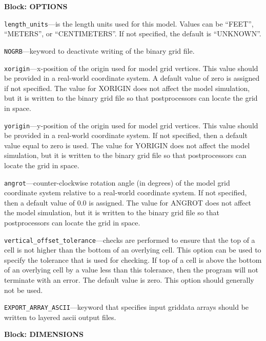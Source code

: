 
\item \textbf{Block: OPTIONS}

\begin{description}
\item \texttt{length\_units}---is the length units used for this model.  Values can be ``FEET'', ``METERS'', or ``CENTIMETERS''.  If not specified, the default is ``UNKNOWN''.

\item \texttt{NOGRB}---keyword to deactivate writing of the binary grid file.

\item \texttt{xorigin}---x-position of the origin used for model grid vertices.  This value should be provided in a real-world coordinate system.  A default value of zero is assigned if not specified.  The value for XORIGIN does not affect the model simulation, but it is written to the binary grid file so that postprocessors can locate the grid in space.

\item \texttt{yorigin}---y-position of the origin used for model grid vertices.  This value should be provided in a real-world coordinate system.  If not specified, then a default value equal to zero is used.  The value for YORIGIN does not affect the model simulation, but it is written to the binary grid file so that postprocessors can locate the grid in space.

\item \texttt{angrot}---counter-clockwise rotation angle (in degrees) of the model grid coordinate system relative to a real-world coordinate system.  If not specified, then a default value of 0.0 is assigned.  The value for ANGROT does not affect the model simulation, but it is written to the binary grid file so that postprocessors can locate the grid in space.

\item \texttt{vertical\_offset\_tolerance}---checks are performed to ensure that the top of a cell is not higher than the bottom of an overlying cell.  This option can be used to specify the tolerance that is used for checking.  If top of a cell is above the bottom of an overlying cell by a value less than this tolerance, then the program will not terminate with an error.  The default value is zero.  This option should generally not be used.

\item \texttt{EXPORT\_ARRAY\_ASCII}---keyword that specifies input griddata arrays should be written to layered ascii output files.

\end{description}
\item \textbf{Block: DIMENSIONS}

